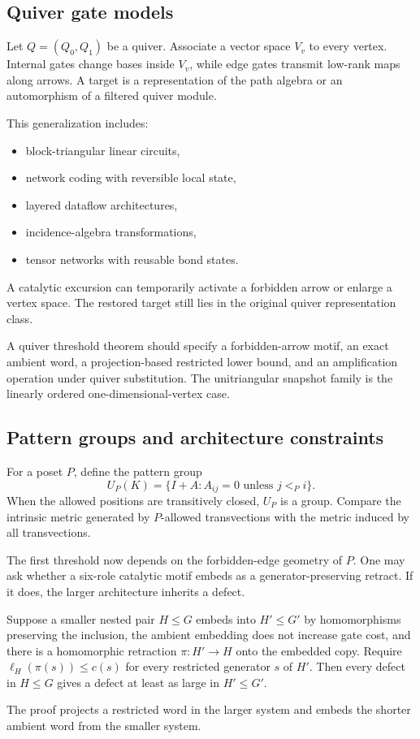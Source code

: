 \subsection{Quiver gate models}
Let $Q=(Q_0,Q_1)$ be a quiver.  Associate a vector space $V_v$ to every vertex.  Internal gates change bases inside $V_v$, while edge gates transmit low-rank maps along arrows.  A target is a representation of the path algebra or an automorphism of a filtered quiver module.

This generalization includes:
\begin{itemize}
\item block-triangular linear circuits,
\item network coding with reversible local state,
\item layered dataflow architectures,
\item incidence-algebra transformations,
\item tensor networks with reusable bond states.
\end{itemize}

A catalytic excursion can temporarily activate a forbidden arrow or enlarge a vertex space.  The restored target still lies in the original quiver representation class.

\begin{skeletonbox}
A quiver threshold theorem should specify a forbidden-arrow motif, an exact ambient word, a projection-based restricted lower bound, and an amplification operation under quiver substitution.  The unitriangular snapshot family is the linearly ordered one-dimensional-vertex case.
\end{skeletonbox}

\subsection{Pattern groups and architecture constraints}
For a poset $P$, define the pattern group
\[
U_P(K)
=
\{I+A:A_{ij}=0\text{ unless }j<_P i\}.
\]
When the allowed positions are transitively closed, $U_P$ is a group.  Compare the intrinsic metric generated by $P$-allowed transvections with the metric induced by all transvections.

The first threshold now depends on the forbidden-edge geometry of $P$.  One may ask whether a six-role catalytic motif embeds as a generator-preserving retract.  If it does, the larger architecture inherits a defect.

\begin{proposition}
Suppose a smaller nested pair $H\le G$ embeds into $H'\le G'$ by homomorphisms preserving the inclusion, the ambient embedding does not increase gate cost, and there is a homomorphic retraction $\pi:H'\to H$ onto the embedded copy.  Require $\ell_H(\pi(s))\le c(s)$ for every restricted generator $s$ of $H'$.  Then every defect in $H\le G$ gives a defect at least as large in $H'\le G'$.
\end{proposition}
The proof projects a restricted word in the larger system and embeds the shorter ambient word from the smaller system.

